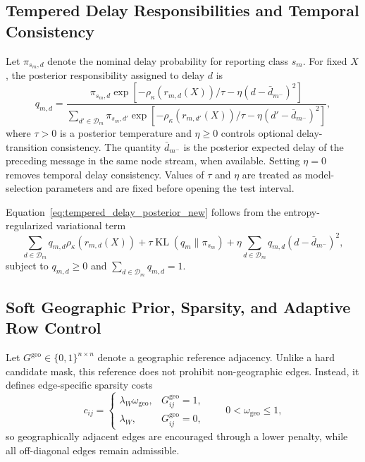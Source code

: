 \subsection{Tempered Delay Responsibilities and Temporal Consistency}
\label{subsec:delay_responsibilities}
Let $\pi_{s_m,d}$ denote the nominal delay probability for reporting class $s_m$. For fixed $X$, the posterior responsibility assigned to delay $d$ is
\begin{equation}
    q_{m,d}
    =\frac{
    \pi_{s_m,d}
    \exp\!\left[
        -\rho_{\kappa}(r_{m,d}(X))/\tau
        -\eta\left(d-\bar d_{m^-}\right)^2
    \right]
    }{
    \displaystyle
    \sum_{d'\in\mathcal{D}_m}
    \pi_{s_m,d'}
    \exp\!\left[
        -\rho_{\kappa}(r_{m,d'}(X))/\tau
        -\eta\left(d'-\bar d_{m^-}\right)^2
    \right]
    },
    \label{eq:tempered_delay_posterior_new}
\end{equation}
where $\tau>0$ is a posterior temperature and $\eta\geq0$ controls optional delay-transition consistency. The quantity $\bar d_{m^-}$ is the posterior expected delay of the preceding message in the same node stream, when available. Setting $\eta=0$ removes temporal delay consistency. Values of $\tau$ and $\eta$ are treated as model-selection parameters and are fixed before opening the test interval.

Equation~\eqref{eq:tempered_delay_posterior_new} follows from the entropy-regularized variational term
\begin{equation}
    \sum_{d\in\mathcal{D}_m}q_{m,d}\rho_{\kappa}(r_{m,d}(X))
    +\tau\operatorname{KL}(q_m\|\pi_{s_m})
    +\eta\sum_{d\in\mathcal{D}_m}q_{m,d}
    \left(d-\bar d_{m^-}\right)^2,
    \label{eq:delay_variational_term_new}
\end{equation}
subject to $q_{m,d}\geq0$ and $\sum_{d\in\mathcal{D}_m}q_{m,d}=1$.

\subsection{Soft Geographic Prior, Sparsity, and Adaptive Row Control}
\label{subsec:graph_regularization}
Let $G^{\mathrm{geo}}\in\{0,1\}^{n\times n}$ denote a geographic reference adjacency. Unlike a hard candidate mask, this reference does not prohibit non-geographic edges. Instead, it defines edge-specific sparsity costs
\begin{equation}
    c_{ij}=
    \begin{cases}
        \lambda_W\omega_{\mathrm{geo}}, & G^{\mathrm{geo}}_{ij}=1,\\
        \lambda_W, & G^{\mathrm{geo}}_{ij}=0,
    \end{cases}
    \qquad 0<\omega_{\mathrm{geo}}\leq1,
    \label{eq:soft_geo_weights_new}
\end{equation}
so geographically adjacent edges are encouraged through a lower penalty, while all off-diagonal edges remain admissible.

